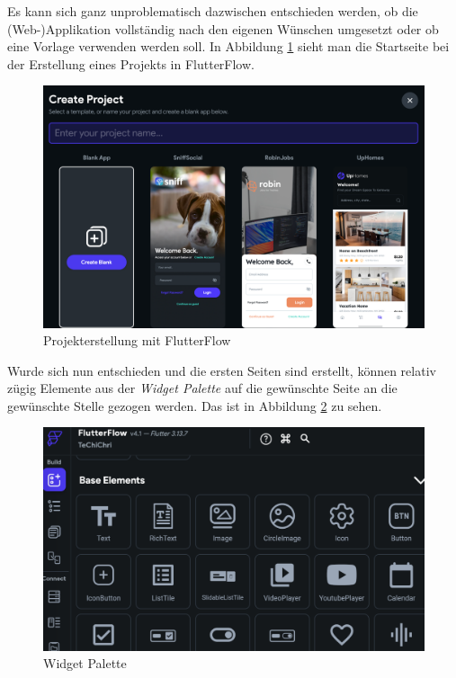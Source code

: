 \documentclass[acmtog, language=ngerman]{acmart}
\begin{document}
Es kann sich ganz unproblematisch dazwischen entschieden werden, ob die (Web-)Applikation vollständig nach den eigenen Wünschen umgesetzt oder ob eine Vorlage verwenden werden soll.
In Abbildung \ref{fig:startseite_projekterstellung} sieht man die Startseite bei der Erstellung eines Projekts in FlutterFlow.
\begin{figure}[h]
    \centering
    \includegraphics[width=1\linewidth]{images/FF_projekt_erstellen.png}
    \caption{Projekterstellung mit FlutterFlow}
    \label{fig:startseite_projekterstellung}
\end{figure}
Wurde sich nun entschieden und die ersten Seiten sind erstellt, können relativ zügig Elemente aus der \textit{Widget Palette} auf die gewünschte Seite an die gewünschte Stelle gezogen werden. Das ist in Abbildung \ref{fig:widget_palette} zu sehen.
\begin{figure}[h]
    \centering
    \includegraphics[width=1\linewidth]{images/FF_widget_palette.png}
    \caption{Widget Palette}
    \label{fig:widget_palette}
\end{figure}
\end{document}
